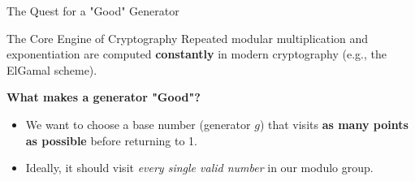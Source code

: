 \documentclass[aspectratio=169, 10pt]{beamer}
\begin{document}
\begin{frame}{The Quest for a "Good" Generator}
    
    \begin{block}{The Core Engine of Cryptography}
        Repeated modular multiplication and exponentiation are computed \textbf{constantly} in modern cryptography (e.g., the ElGamal scheme).
    \end{block}

    \vspace{0.4cm}
    \textbf{What makes a generator "Good"?}
    \begin{itemize}
        \item We want to choose a base number (generator $g$) that visits \textbf{as many points as possible} before returning to 1.
        \vspace{0.2cm}
        \item Ideally, it should visit \textit{every single valid number} in our modulo group.
        \vspace{0.3cm}
    \end{itemize}
\end{frame}
\end{document}
